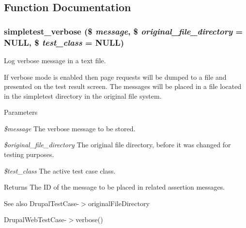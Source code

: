 \subsection{Function Documentation}
\hypertarget{drupal__web__test__case_8php_ac8ef212d48360d65d8a3697e709565d7}{
\subsubsection[{simpletest\_\-verbose}]{\setlength{\rightskip}{0pt plus 5cm}simpletest\_\-verbose (\$ {\em message}, \/  \$ {\em original\_\-file\_\-directory} = {\ttfamily NULL}, \/  \$ {\em test\_\-class} = {\ttfamily NULL})}}
\label{drupal__web__test__case_8php_ac8ef212d48360d65d8a3697e709565d7}
Log verbose message in a text file.

If verbose mode is enabled then page requests will be dumped to a file and presented on the test result screen. The messages will be placed in a file located in the simpletest directory in the original file system.


\begin{DoxyParams}{Parameters}
\item[{\em \$message}]The verbose message to be stored. \item[{\em \$original\_\-file\_\-directory}]The original file directory, before it was changed for testing purposes. \item[{\em \$test\_\-class}]The active test case class. \end{DoxyParams}
\begin{DoxyReturn}{Returns}
The ID of the message to be placed in related assertion messages. 
\end{DoxyReturn}
\begin{DoxySeeAlso}{See also}
DrupalTestCase-\/$>$originalFileDirectory 

DrupalWebTestCase-\/$>$verbose() 
\end{DoxySeeAlso}
